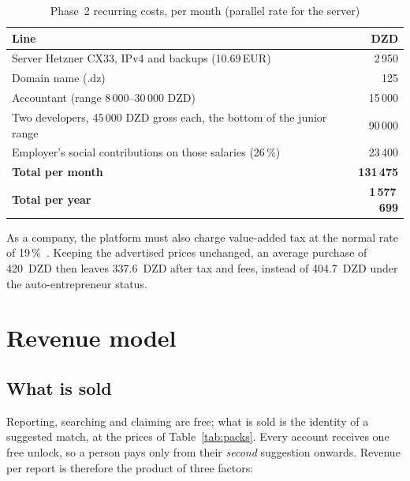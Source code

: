 \begin{table}[htbp]
\centering
\caption{Phase~2 recurring costs, per month (parallel rate for the server)}
\label{tab:phase2-costs}
\small
\begin{tabularx}{\textwidth}{@{}X r@{}}
\toprule
\textbf{Line} & \textbf{DZD} \\
\midrule
Server Hetzner CX33, IPv4 and backups (10.69\,EUR)~\cite{hetzner2026,cloudtally2026} & 2\,950 \\
Domain name (.dz)~\cite{hostarts2026}                                                  & 125 \\
Accountant (range 8\,000--30\,000 DZD)~\cite{creation2026}                             & 15\,000 \\
Two developers, 45\,000 DZD gross each, the bottom of the junior range~\cite{ctadz2026} & 90\,000 \\
Employer's social contributions on those salaries (26\,\%)                             & 23\,400 \\
\midrule
\textbf{Total per month}                                                               & \textbf{131\,475} \\
\textbf{Total per year}                                                                & \textbf{1\,577\,699} \\
\bottomrule
\end{tabularx}
\end{table}

As a company, the platform must also charge value-added tax at the normal rate
of 19\,\%~\cite{tva2026}. Keeping the advertised prices unchanged, an average
purchase of 420~DZD then leaves 337.6~DZD after tax and fees, instead of
404.7~DZD under the auto-entrepreneur status.

\section{Revenue model}

\subsection{What is sold}

Reporting, searching and claiming are free; what is sold is the identity of a
suggested match, at the prices of Table~\ref{tab:packs}. Every account receives
one free unlock, so a person pays only from their \emph{second} suggestion
onwards. Revenue per report is therefore the product of three factors:

